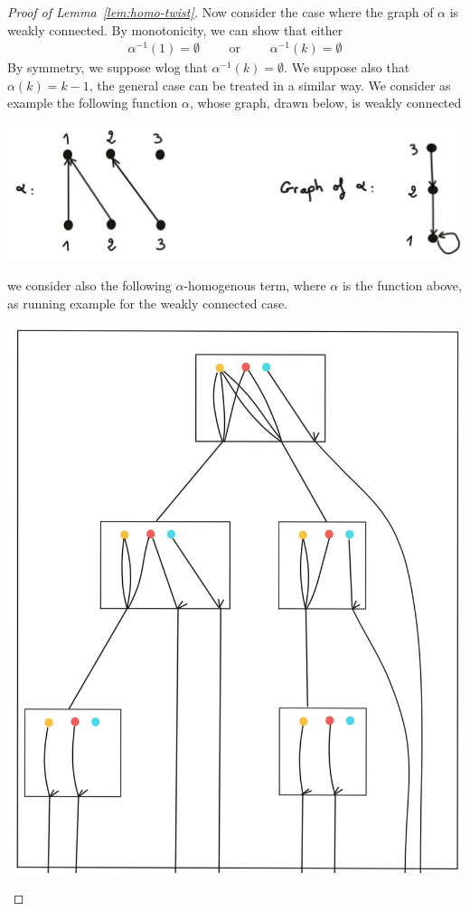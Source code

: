 \begin{proof}[Proof of Lemma~\ref{lem:homo-twist}]
\medskip
Now consider the case where the graph of $\alpha$ is weakly connected. By monotonicity, we can show that either
\begin{align*}
\alpha^{-1}(1)=\emptyset\qquad\text{ or }\qquad\alpha^{-1}(k)=\emptyset
\end{align*}
By symmetry, we suppose wlog that $\alpha^{-1}(k)=\emptyset$. We suppose also that $\alpha(k)=k-1$, the general case can be treated in a similar way.
We consider as example the following function $\alpha$, whose graph, drawn below, is weakly connected
\begin{center}
\includegraphics[scale=.1]{MyPic32.jpg}
\end{center}
we consider also the following $\alpha$-homogenous term, where $\alpha$ is the function above, as running example for the weakly connected case. 
\begin{center}
\includegraphics[scale=.1]{MyPic33.jpg}

\end{center}
\end{proof}
